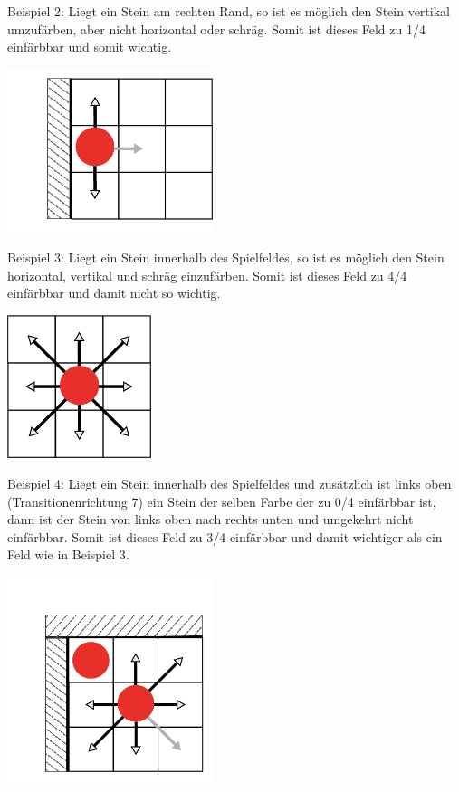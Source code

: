 \documentclass[12pt,a4paper,bibliography=totocnumbered,listof=totocnumbered]{scrartcl}
\begin{document}
    Beispiel 2: Liegt ein Stein am rechten Rand, so ist es möglich den Stein vertikal umzufärben, aber nicht horizontal oder schräg. Somit ist dieses Feld zu 1/4 einfärbbar und somit wichtig.\newline

    \includegraphics[width=6cm]{pics/Kapitel_3/Kapitel_3_pic2.png}

    Beispiel 3: Liegt ein Stein innerhalb des Spielfeldes, so ist es möglich den Stein horizontal, vertikal und schräg einzufärben. Somit ist dieses Feld zu 4/4 einfärbbar und damit nicht so wichtig.\newline

    \includegraphics[width=4.2cm]{pics/Kapitel_3/Kapitel_3_pic3.png}

    Beispiel 4: Liegt ein Stein innerhalb des Spielfeldes und zusätzlich ist links oben (Transitionenrichtung 7) ein Stein der selben Farbe der zu 0/4 einfärbbar ist, dann ist der Stein von links oben nach rechts unten und umgekehrt nicht einfärbbar. Somit ist dieses Feld zu 3/4 einfärbbar und damit wichtiger als ein Feld wie in Beispiel 3.\newline

    \includegraphics[width=6cm]{pics/Kapitel_3/Kapitel_3_pic4.png}
\end{document}
